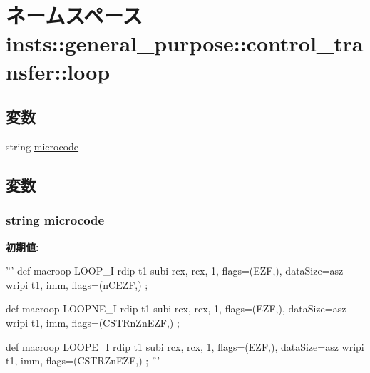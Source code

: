 \hypertarget{namespaceinsts_1_1general__purpose_1_1control__transfer_1_1loop}{
\section{ネームスペース insts::general\_\-purpose::control\_\-transfer::loop}
\label{namespaceinsts_1_1general__purpose_1_1control__transfer_1_1loop}
}
\subsection*{変数}
\begin{DoxyCompactItemize}
\item 
string \hyperlink{namespaceinsts_1_1general__purpose_1_1control__transfer_1_1loop_a770f11a173e99389a8802f0107ed8f52}{microcode}
\end{DoxyCompactItemize}


\subsection{変数}
\hypertarget{namespaceinsts_1_1general__purpose_1_1control__transfer_1_1loop_a770f11a173e99389a8802f0107ed8f52}{
\subsubsection[{microcode}]{\setlength{\rightskip}{0pt plus 5cm}string {\bf microcode}}}
\label{namespaceinsts_1_1general__purpose_1_1control__transfer_1_1loop_a770f11a173e99389a8802f0107ed8f52}
{\bfseries 初期値:}
\begin{DoxyCode}
'''
def macroop LOOP_I {
    rdip t1
    subi rcx, rcx, 1, flags=(EZF,), dataSize=asz
    wripi t1, imm, flags=(nCEZF,)
};

def macroop LOOPNE_I {
    rdip t1
    subi rcx, rcx, 1, flags=(EZF,), dataSize=asz
    wripi t1, imm, flags=(CSTRnZnEZF,)
};

def macroop LOOPE_I {
    rdip t1
    subi rcx, rcx, 1, flags=(EZF,), dataSize=asz
    wripi t1, imm, flags=(CSTRZnEZF,)
};
'''
\end{DoxyCode}
